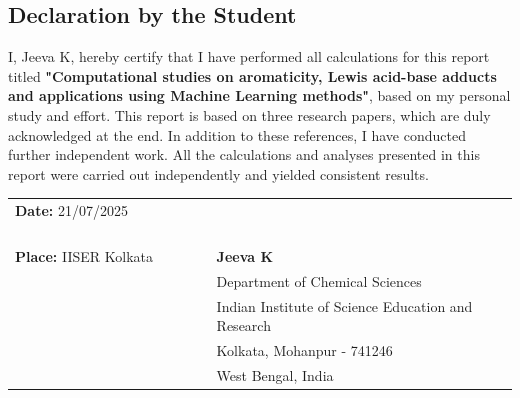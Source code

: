 \begin{center}
    \section*{Declaration by the Student}
\end{center}

\vspace{1cm}

\justify
I, Jeeva K, hereby certify that I have performed all calculations for
this report titled \textbf{"Computational studies on aromaticity, Lewis acid-base adducts and applications using Machine Learning methods"}, based on my personal study and effort. This report is based on three research papers, which are duly acknowledged at the end. In addition to these references, I have conducted further independent work. All the calculations and analyses presented in this report were carried out independently and yielded consistent results.

\vspace{3cm}

\noindent
\begin{tabular}{@{}p{0.4\linewidth}@{}p{0.6\linewidth}@{}}
\textbf{Date:} 21/07/2025   \\[1.5ex]
\\
\\
\dotfill \\ &   \\[1.5ex]
\textbf{Place:} IISER Kolkata &  \hspace{3cm}\textbf{Jeeva K}\\[1.5ex]
& \hspace{1cm}Department of Chemical Sciences \\[1.55ex]
& Indian Institute of Science Education and Research  \\[1.5ex]
& \hspace{1cm} Kolkata, Mohanpur - 741246  \\[1.5ex]
& \hspace{2cm} West Bengal, India \\[1.5ex]
\end{tabular}


\vspace{2cm}
\noindent\dotfill
